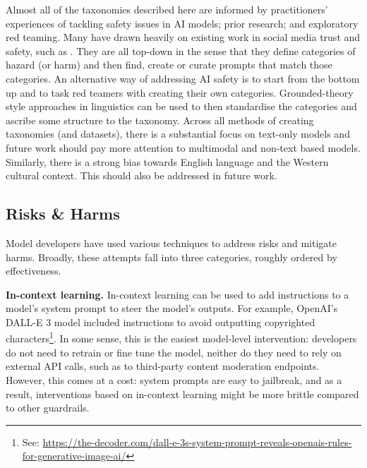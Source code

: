 \begin{enumerate}
\end{enumerate}


Almost all of the taxonomies described here are informed by practitioners' experiences of tackling safety issues in AI models; prior research; and exploratory red teaming. Many have drawn heavily on existing work in social media trust and safety, such as \citet{banko-etal-2020-unified, dev-etal-2022-measures}. They are all top-down in the sense that they define categories of hazard (or harm) and then find, create or curate prompts that match those categories. An alternative way of addressing AI safety is to start from the bottom up and to task red teamers with creating their own categories. Grounded-theory style approaches in linguistics can be used to then standardise the categories and ascribe some structure to the taxonomy. 
Across all methods of creating taxonomies (and datasets), there is a substantial focus on text-only models and future work should pay more attention to multimodal and non-text based models. Similarly, there is a strong bias towards English language and the Western cultural context. This should also be addressed in future work. 






% 

\subsection{Risks \& Harms}
\vspace{-2mm}

% 

Model developers have used various techniques to address risks and mitigate harms. Broadly, these attempts fall into three categories, roughly ordered by effectiveness.

\textbf{In-context learning.} In-context learning can be used to add instructions to a model's system prompt to steer the model's outputs. For example, OpenAI's DALL-E 3 model included instructions to avoid outputting copyrighted characters\footnote{See: \url{https://the-decoder.com/dall-e-3s-system-prompt-reveals-openais-rules-for-generative-image-ai/}}. In some sense, this is the easiest model-level intervention: developers do not need to retrain or fine tune the model, neither do they need to rely on external API calls, such as to third-party content moderation endpoints. However, this comes at a cost: system prompts are easy to jailbreak, and as a result, interventions based on in-context learning might be more brittle compared to other guardrails.

